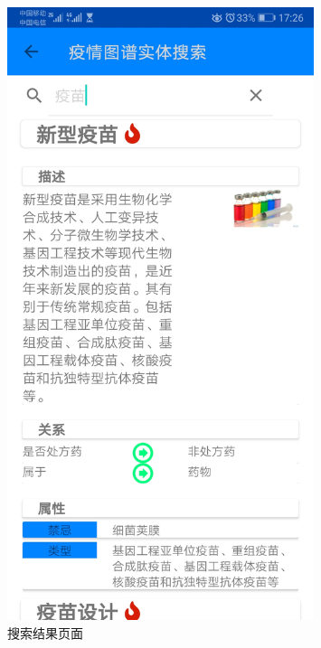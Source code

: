 \documentclass[UTF8]{article}
\begin{document}
\begin{figure}[htbp]
{\begin{minipage}[t]{0.25\linewidth}
    \includegraphics[width=0.8\textwidth]{searchentity4}
    \end{minipage}%
    }%

    \centering
    \caption{搜索结果页面}
    \end{figure}


            
\end{document}
